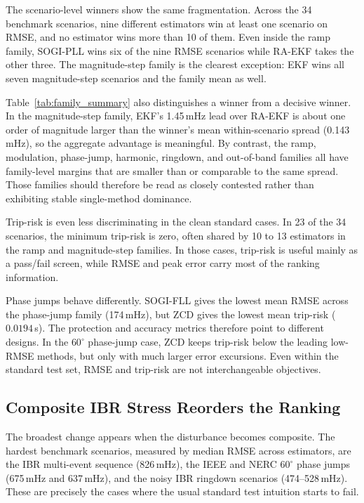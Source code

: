 The scenario-level winners show the same fragmentation. Across the 34
benchmark scenarios, nine different estimators win at least one scenario on
RMSE, and no estimator wins more than 10 of them. Even inside the ramp
family, SOGI-PLL wins six of the nine RMSE scenarios while RA-EKF takes the
other three. The magnitude-step family is the clearest exception: EKF wins all
seven magnitude-step scenarios and the family mean as well.

Table~\ref{tab:family_summary} also distinguishes a winner from a decisive
winner. In the magnitude-step family, EKF's 1.45\,mHz lead over RA-EKF is about
one order of magnitude larger than the winner's mean within-scenario spread
(0.143\,mHz), so the aggregate advantage is meaningful. By contrast, the ramp,
modulation, phase-jump, harmonic, ringdown, and out-of-band families all have
family-level margins that are smaller than or comparable to the same spread.
Those families should therefore be read as closely contested rather than
exhibiting stable single-method dominance.

Trip-risk is even less discriminating in the clean standard cases. In 23 of the
34 scenarios, the minimum trip-risk is zero, often
shared by 10 to 13 estimators in the ramp and magnitude-step families. In those
cases, trip-risk is useful mainly as a pass/fail screen, while RMSE and peak
error carry most of the ranking information.

Phase jumps behave differently. SOGI-FLL gives the lowest mean RMSE across the
phase-jump family (174\,mHz), but ZCD gives the lowest mean trip-risk
($0.0194$\,s). The protection and accuracy metrics therefore point to
different designs. In the $60^\circ$ phase-jump case, ZCD keeps trip-risk below
the leading low-RMSE methods, but only with much larger error excursions. Even
within the standard test set, RMSE and trip-risk are not interchangeable
objectives.

\subsection{Composite IBR Stress Reorders the Ranking}

The broadest change appears when the disturbance becomes composite. The hardest
benchmark scenarios, measured by median RMSE across estimators, are the IBR
multi-event sequence (826\,mHz), the IEEE and NERC $60^\circ$ phase jumps
(675\,mHz and 637\,mHz), and the noisy IBR ringdown scenarios
(474--528\,mHz). These are precisely the cases where the usual standard test
intuition starts to fail.

